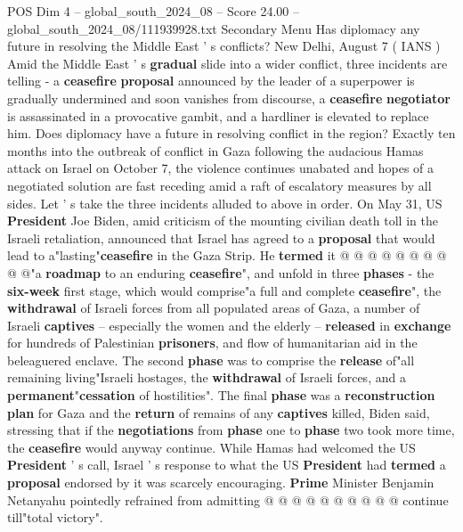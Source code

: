 \begin{textsample}{POS Dim 4 – global\_south\_2024\_08 – Score 24.00 – global\_south\_2024\_08/111939928.txt}  \label{ex:f4_pos_123}
Secondary Menu Has diplomacy any future in resolving the Middle East ' s conflicts?
New Delhi, August 7 ( IANS ) Amid the Middle East ' s \textbf{gradual} slide into a wider conflict, three incidents are telling - a \textbf{ceasefire} \textbf{proposal} announced by the leader of a superpower is gradually undermined and soon vanishes from discourse, a \textbf{ceasefire} \textbf{negotiator} is assassinated in a provocative gambit, and a hardliner is elevated to replace him.
Does diplomacy have a future in resolving conflict in the region?
Exactly ten months into the outbreak of conflict in Gaza following the audacious Hamas attack on Israel on October 7, the violence continues unabated and hopes of a negotiated solution are fast receding amid a raft of escalatory measures by all sides.
Let ' s take the three incidents alluded to above in order.
On May 31, US \textbf{President} Joe Biden, amid criticism of the mounting civilian death toll in the Israeli retaliation, announced that Israel has agreed to a \textbf{proposal} that would lead to a"lasting"\textbf{ceasefire} in the Gaza Strip.
He \textbf{termed} it @ @ @ @ @ @ @ @ @ @"a \textbf{roadmap} to an enduring \textbf{ceasefire}", and unfold in three \textbf{phases} - the \textbf{six-week} first stage, which would comprise"a full and complete \textbf{ceasefire}", the \textbf{withdrawal} of Israeli forces from all populated areas of Gaza, a number of Israeli \textbf{captives} -- especially the women and the elderly -- \textbf{released} in \textbf{exchange} for hundreds of Palestinian \textbf{prisoners}, and flow of humanitarian aid in the beleaguered enclave.
The second \textbf{phase} was to comprise the \textbf{release} of"all remaining living"Israeli hostages, the \textbf{withdrawal} of Israeli forces, and a \textbf{permanent}"\textbf{cessation} of hostilities".
The final \textbf{phase} was a \textbf{reconstruction} \textbf{plan} for Gaza and the \textbf{return} of remains of any \textbf{captives} killed, Biden said, stressing that if the \textbf{negotiations} from \textbf{phase} one to \textbf{phase} two took more time, the \textbf{ceasefire} would anyway continue.
While Hamas had welcomed the US \textbf{President} ' s call, Israel ' s response to what the US \textbf{President} had \textbf{termed} a \textbf{proposal} endorsed by it was scarcely encouraging. \textbf{Prime} Minister Benjamin Netanyahu pointedly refrained from admitting @ @ @ @ @ @ @ @ @ @ continue till"total victory".

\end{textsample}
